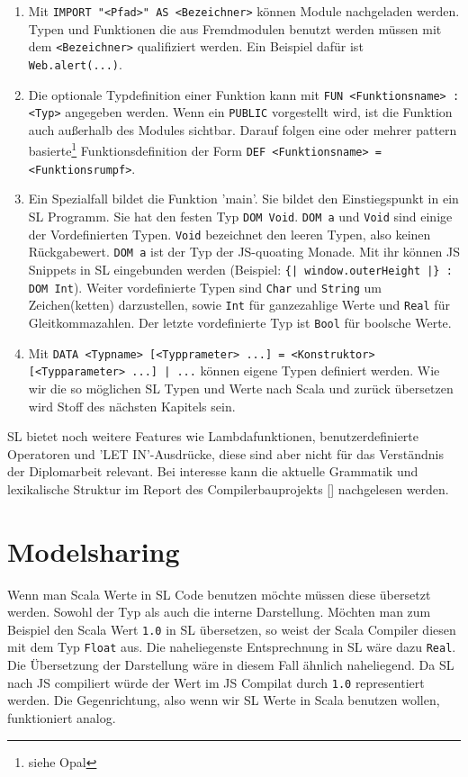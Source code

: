 \documentclass[12pt,a4paper]{report}
\begin{document}
\begin{enumerate}
  \item Mit \lstinline!IMPORT "<Pfad>" AS <Bezeichner>! können Module nachgeladen werden. Typen und Funktionen die aus Fremdmodulen benutzt werden müssen mit dem \lstinline!<Bezeichner>! qualifiziert werden. Ein Beispiel dafür ist \lstinline!Web.alert(...)!.
  \item Die optionale Typdefinition einer Funktion kann mit \lstinline!FUN <Funktionsname> : <Typ>! angegeben werden. Wenn ein \lstinline!PUBLIC! vorgestellt wird, ist die Funktion auch außerhalb des Modules sichtbar. Darauf folgen eine oder mehrer pattern basierte\footnote{siehe Opal} Funktionsdefinition der Form \lstinline!DEF <Funktionsname> = <Funktionsrumpf>!.
  \item Ein Spezialfall bildet die Funktion 'main'. Sie bildet den Einstiegspunkt in ein \ac{SL} Programm. Sie hat den festen Typ \lstinline!DOM Void!. \lstinline!DOM a! und \lstinline!Void! sind einige der Vordefinierten Typen. \lstinline!Void! bezeichnet den leeren Typen, also keinen Rückgabewert. \lstinline!DOM a! ist der Typ der \ac{JS}-quoating Monade. Mit ihr können \ac{JS} Snippets in \ac{SL} eingebunden werden (Beispiel: \lstinline!{| window.outerHeight |} : DOM Int!). Weiter vordefinierte Typen sind \lstinline!Char! und \lstinline!String! um Zeichen(ketten) darzustellen, sowie \lstinline!Int! für ganzezahlige Werte und \lstinline!Real! für Gleitkommazahlen. Der letzte vordefinierte Typ ist \lstinline!Bool! für boolsche Werte.
  \item Mit \lstinline!DATA <Typname> [<Typprameter> ...] = <Konstruktor> [<Typparameter> ...] | ...! können eigene Typen definiert werden. Wie wir die so möglichen \ac{SL} Typen und Werte nach Scala und zurück übersetzen wird Stoff des nächsten Kapitels sein.
\end{enumerate}

\ac{SL} bietet noch weitere Features wie Lambdafunktionen, benutzerdefinierte Operatoren und 'LET IN'-Ausdrücke, diese sind aber nicht für das Verständnis der Diplomarbeit relevant. Bei interesse kann die aktuelle Grammatik und lexikalische Struktur im Report des Compilerbauprojekts [] nachgelesen werden.

\chapter{Modelsharing}

Wenn man Scala Werte in \ac{SL} Code benutzen möchte müssen diese übersetzt werden. Sowohl der Typ als auch die interne Darstellung. Möchten man zum Beispiel den Scala Wert \lstinline!1.0! in \ac{SL} übersetzen, so weist der Scala Compiler diesen mit dem Typ \lstinline!Float! aus. Die naheliegenste Entsprechnung in \ac{SL} wäre dazu \lstinline!Real!. Die Übersetzung der Darstellung wäre in diesem Fall ähnlich naheliegend. Da \ac{SL} nach \ac{JS} compiliert würde der Wert im \ac{JS} Compilat durch \lstinline!1.0! representiert werden. Die Gegenrichtung, also wenn wir \ac{SL} Werte in Scala benutzen wollen, funktioniert analog. 
\end{document}
